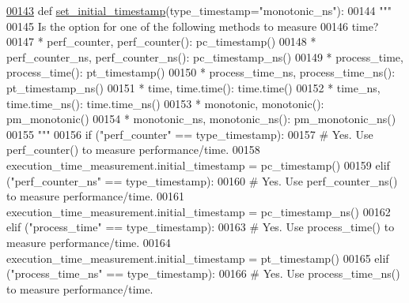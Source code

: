\begin{DoxyCode}
\hypertarget{classutilities_1_1timing__measurements_1_1performance__measurement_1_1execution__time__measurement_l00143}{}\hyperlink{classutilities_1_1timing__measurements_1_1performance__measurement_1_1execution__time__measurement_aa82fdf41b58ed820066c6f74450a2e66}{00143}     \textcolor{keyword}{def }\hyperlink{classutilities_1_1timing__measurements_1_1performance__measurement_1_1execution__time__measurement_aa82fdf41b58ed820066c6f74450a2e66}{set\_initial\_timestamp}(type\_timestamp="monotonic\_ns"):
00144         \textcolor{stringliteral}{"""}
00145 \textcolor{stringliteral}{            Is the option for one of the following methods to measure}
00146 \textcolor{stringliteral}{                time?}
00147 \textcolor{stringliteral}{                * perf\_counter, perf\_counter(): pc\_timestamp()}
00148 \textcolor{stringliteral}{                * perf\_counter\_ns, perf\_counter\_ns(): pc\_timestamp\_ns()}
00149 \textcolor{stringliteral}{                * process\_time, process\_time(): pt\_timestamp()}
00150 \textcolor{stringliteral}{                * process\_time\_ns, process\_time\_ns(): pt\_timestamp\_ns()}
00151 \textcolor{stringliteral}{                * time, time.time(): time.time()}
00152 \textcolor{stringliteral}{                * time\_ns, time.time\_ns(): time.time\_ns()}
00153 \textcolor{stringliteral}{                * monotonic, monotonic(): pm\_monotonic()}
00154 \textcolor{stringliteral}{                * monotonic\_ns, monotonic\_ns(): pm\_monotonic\_ns()}
00155 \textcolor{stringliteral}{        """}
00156         \textcolor{keywordflow}{if} (\textcolor{stringliteral}{"perf\_counter"} == type\_timestamp):
00157             \textcolor{comment}{# Yes. Use perf\_counter() to measure performance/time.}
00158             execution\_time\_measurement.initial\_timestamp = pc\_timestamp()
00159         \textcolor{keywordflow}{elif} (\textcolor{stringliteral}{"perf\_counter\_ns"} == type\_timestamp):
00160             \textcolor{comment}{# Yes. Use perf\_counter\_ns() to measure performance/time.}
00161             execution\_time\_measurement.initial\_timestamp = pc\_timestamp\_ns()
00162         \textcolor{keywordflow}{elif} (\textcolor{stringliteral}{"process\_time"} == type\_timestamp):
00163             \textcolor{comment}{# Yes. Use process\_time() to measure performance/time.}
00164             execution\_time\_measurement.initial\_timestamp = pt\_timestamp()
00165         \textcolor{keywordflow}{elif} (\textcolor{stringliteral}{"process\_time\_ns"} == type\_timestamp):
00166             \textcolor{comment}{# Yes. Use process\_time\_ns() to measure performance/time.}

\end{DoxyCode}
